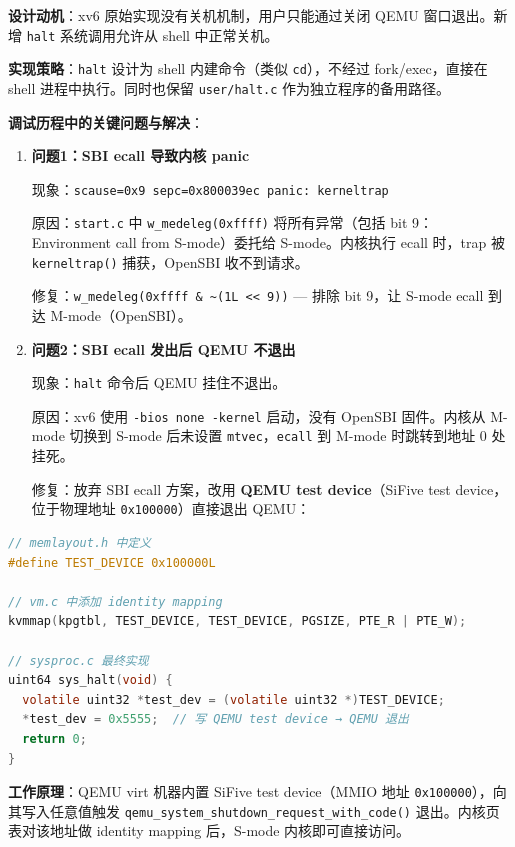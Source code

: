 \documentclass[12pt,a4paper]{ctexart}
\begin{document}
\textbf{设计动机}：xv6 原始实现没有关机机制，用户只能通过关闭 QEMU 窗口退出。新增 \texttt{halt} 系统调用允许从 shell 中正常关机。

\textbf{实现策略}：\texttt{halt} 设计为 shell 内建命令（类似 \texttt{cd}），不经过 fork/exec，直接在 shell 进程中执行。同时也保留 \texttt{user/halt.c} 作为独立程序的备用路径。

\textbf{调试历程中的关键问题与解决}：

\begin{enumerate}
  \item \textbf{问题1：SBI ecall 导致内核 panic}

  现象：\texttt{scause=0x9 sepc=0x800039ec panic: kerneltrap}

  原因：\texttt{start.c} 中 \texttt{w\_medeleg(0xffff)} 将所有异常（包括 bit 9：Environment call from S-mode）委托给 S-mode。内核执行 ecall 时，trap 被 \texttt{kerneltrap()} 捕获，OpenSBI 收不到请求。

  修复：\texttt{w\_medeleg(0xffff \& \textasciitilde(1L << 9))} — 排除 bit 9，让 S-mode ecall 到达 M-mode（OpenSBI）。

  \item \textbf{问题2：SBI ecall 发出后 QEMU 不退出}

  现象：\texttt{halt} 命令后 QEMU 挂住不退出。

  原因：xv6 使用 \texttt{-bios none -kernel} 启动，没有 OpenSBI 固件。内核从 M-mode 切换到 S-mode 后未设置 \texttt{mtvec}，\texttt{ecall} 到 M-mode 时跳转到地址 0 处挂死。

  修复：放弃 SBI ecall 方案，改用 \textbf{QEMU test device}（SiFive test device，位于物理地址 \texttt{0x100000}）直接退出 QEMU：
\end{enumerate}

\begin{lstlisting}[language=C, caption={halt 关机最终实现（kernel/sysproc.c）}]
// memlayout.h 中定义
#define TEST_DEVICE 0x100000L

// vm.c 中添加 identity mapping
kvmmap(kpgtbl, TEST_DEVICE, TEST_DEVICE, PGSIZE, PTE_R | PTE_W);

// sysproc.c 最终实现
uint64 sys_halt(void) {
  volatile uint32 *test_dev = (volatile uint32 *)TEST_DEVICE;
  *test_dev = 0x5555;  // 写 QEMU test device → QEMU 退出
  return 0;
}
\end{lstlisting}

\textbf{工作原理}：QEMU virt 机器内置 SiFive test device（MMIO 地址 \texttt{0x100000}），向其写入任意值触发 \texttt{qemu\_system\_shutdown\_request\_with\_code()} 退出。内核页表对该地址做 identity mapping 后，S-mode 内核即可直接访问。
\end{document}
